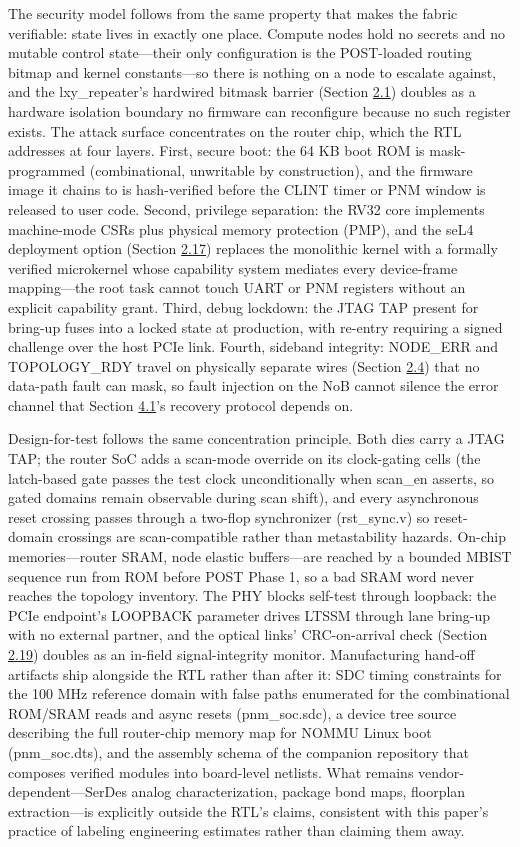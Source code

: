 \documentclass[12pt,onecolumn]{article}
\begin{document}
The security model follows from the same property that makes the fabric verifiable: state lives in exactly one place. Compute nodes hold no secrets and no mutable control state---their only configuration is the POST-loaded routing bitmap and kernel constants---so there is nothing on a node to escalate against, and the lxy\_repeater's hardwired bitmask barrier (Section \hyperref[sec:2.1]{2.1}) doubles as a hardware isolation boundary no firmware can reconfigure because no such register exists\cite{9}. The attack surface concentrates on the router chip, which the RTL addresses at four layers. First, secure boot: the 64 KB boot ROM is mask-programmed (combinational, unwritable by construction), and the firmware image it chains to is hash-verified before the CLINT timer or PNM window is released to user code. Second, privilege separation: the RV32 core implements machine-mode CSRs plus physical memory protection (PMP), and the seL4 deployment option (Section \hyperref[sec:2.17]{2.17}) replaces the monolithic kernel with a formally verified microkernel whose capability system mediates every device-frame mapping---the root task cannot touch UART or PNM registers without an explicit capability grant. Third, debug lockdown: the JTAG TAP present for bring-up fuses into a locked state at production, with re-entry requiring a signed challenge over the host PCIe link. Fourth, sideband integrity: NODE\_ERR and TOPOLOGY\_RDY travel on physically separate wires (Section \hyperref[sec:2.4]{2.4}) that no data-path fault can mask, so fault injection on the NoB cannot silence the error channel that Section \hyperref[sec:4.1]{4.1}'s recovery protocol depends on.

Design-for-test follows the same concentration principle. Both dies carry a JTAG TAP; the router SoC adds a scan-mode override on its clock-gating cells (the latch-based gate passes the test clock unconditionally when scan\_en asserts, so gated domains remain observable during scan shift), and every asynchronous reset crossing passes through a two-flop synchronizer (rst\_sync.v) so reset-domain crossings are scan-compatible rather than metastability hazards. On-chip memories---router SRAM, node elastic buffers---are reached by a bounded MBIST sequence run from ROM before POST Phase 1, so a bad SRAM word never reaches the topology inventory. The PHY blocks self-test through loopback: the PCIe endpoint's LOOPBACK parameter drives LTSSM through lane bring-up with no external partner, and the optical links' CRC-on-arrival check (Section \hyperref[sec:2.19]{2.19}) doubles as an in-field signal-integrity monitor. Manufacturing hand-off artifacts ship alongside the RTL rather than after it: SDC timing constraints for the 100 MHz reference domain with false paths enumerated for the combinational ROM/SRAM reads and async resets (pnm\_soc.sdc), a device tree source describing the full router-chip memory map for NOMMU Linux boot (pnm\_soc.dts), and the assembly schema of the companion repository that composes verified modules into board-level netlists. What remains vendor-dependent---SerDes analog characterization, package bond maps, floorplan extraction---is explicitly outside the RTL's claims, consistent with this paper's practice of labeling engineering estimates rather than claiming them away.
\end{document}
